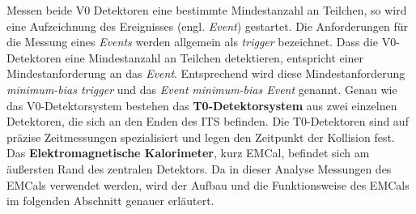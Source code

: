 Messen beide V0 Detektoren eine bestimmte Mindestanzahl an Teilchen, so wird eine Aufzeichnung des Ereignisses (engl. \textit{Event}) gestartet.
Die Anforderungen für die Messung eines \textit{Events} werden allgemein als \textit{trigger} bezeichnet.
Dass die V0-Detektoren eine Mindestanzahl an Teilchen detektieren, entspricht einer Mindestanforderung an das \textit{Event}.
Entsprechend wird diese Mindestanforderung \textit{minimum-bias trigger} und das \textit{Event} \textit{minimum-bias Event} genannt.
\newline
Genau wie das V0-Detektorsystem bestehen das \textbf{T0-Detektorsystem} aus zwei einzelnen Detektoren, die sich an den Enden des ITS befinden.
Die T0-Detektoren sind auf präzise Zeitmessungen spezialisiert und legen den Zeitpunkt der Kollision fest.
\newline
Das \textbf{Elektromagnetische Kalorimeter}, kurz EMCal, befindet sich am äußersten Rand des zentralen Detektors.
Da in dieser Analyse Messungen des EMCals verwendet werden, wird der Aufbau und die Funktionsweise des EMCals im folgenden Abschnitt genauer erläutert.